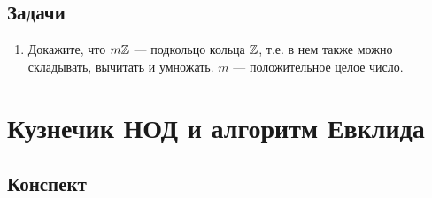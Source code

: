 \subsection*{Задачи}
\begin{enumerate}
\item Докажите, что $m\mathbb Z$ --- подкольцо кольца $\mathbb Z$, т.е. в нем также можно складывать, вычитать и умножать. $m$ --- положительное целое число.
\end{enumerate}

\section{Кузнечик НОД и алгоритм Евклида}

\subsection*{Конспект}
